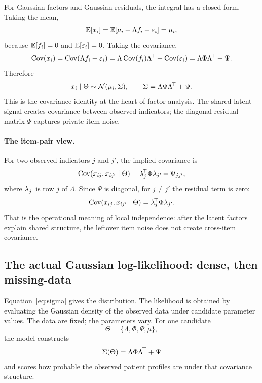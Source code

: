 For Gaussian factors and Gaussian residuals, the integral has a closed form. Taking the mean,
\begin{equation}
\mathbb{E}[x_i]=\mathbb{E}[\mu_i+\Lambda f_i+\varepsilon_i]=\mu_i,
\end{equation}
because $\mathbb{E}[f_i]=0$ and $\mathbb{E}[\varepsilon_i]=0$. Taking the covariance,
\begin{equation}
\operatorname{Cov}(x_i)
=\operatorname{Cov}(\Lambda f_i+\varepsilon_i)
=\Lambda\operatorname{Cov}(f_i)\Lambda^{\!\top}+\operatorname{Cov}(\varepsilon_i)
=\Lambda\Phi\Lambda^{\!\top}+\Psi.
\end{equation}
Therefore
\begin{equation}
\label{eq:sigma}
x_i\mid\Theta\sim\mathcal{N}(\mu_i,\Sigma),
\qquad
\Sigma=\Lambda\Phi\Lambda^{\!\top}+\Psi.
\end{equation}
This is the covariance identity at the heart of factor analysis. The shared latent signal creates covariance
between observed indicators; the diagonal residual matrix $\Psi$ captures private item noise.

\paragraph{The item-pair view.} For two observed indicators $j$ and $j'$, the implied covariance is
\begin{equation}
\operatorname{Cov}(x_{ij},x_{ij'}\mid\Theta)=\lambda_j^{\!\top}\Phi\lambda_{j'}+\Psi_{jj'},
\end{equation}
where $\lambda_j^{\!\top}$ is row $j$ of $\Lambda$. Since $\Psi$ is diagonal, for $j\ne j'$ the residual term is zero:
\begin{equation}
\operatorname{Cov}(x_{ij},x_{ij'}\mid\Theta)=\lambda_j^{\!\top}\Phi\lambda_{j'}.
\end{equation}
That is the operational meaning of local independence: after the latent factors explain shared structure, the
leftover item noise does not create cross-item covariance.

\subsection{The actual Gaussian log-likelihood: dense, then missing-data}
\label{sub:dense_likelihood}
\label{sub:likelihood}
Equation~\eqref{eq:sigma} gives the distribution. The likelihood is obtained by evaluating the Gaussian density
of the observed data under candidate parameter values. The data are fixed; the parameters vary. For one
candidate
\begin{equation}
\Theta=\{\Lambda,\Phi,\Psi,\mu\},
\end{equation}
the model constructs
\begin{equation}
\Sigma(\Theta)=\Lambda\Phi\Lambda^{\!\top}+\Psi
\end{equation}
and scores how probable the observed patient profiles are under that covariance structure.

